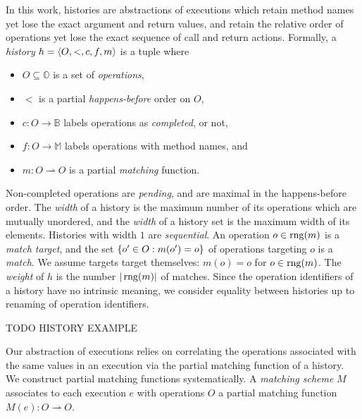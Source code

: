 In this work, histories are abstractions of executions which retain method
names yet lose the exact argument and return values, and retain the relative
order of operations yet lose the exact sequence of call and return actions.
Formally, a \emph{history} $h = {\left\langle{O,<,c,f,m}\right\rangle}$ is a tuple where
\begin{itemize}

  \item $O \subseteq \mathbb{O}$ is a set of \emph{operations},

  \item $<$ is a partial \emph{happens-before} order on $O$,

  \item $c: O \to \mathbb{B}$ labels operations as \emph{completed}, or not,

  \item $f: O \to \mathbb{M}$ labels operations with method names, and

  \item $m: O \rightharpoonup O$ is a partial \emph{matching} function.

\end{itemize}
Non-completed operations are \emph{pending}, and are maximal in the
happens-before order. The \emph{width} of a history is the maximum number of
its operations which are mutually unordered, and the \emph{width} of a history
set is the maximum width of its elements. Histories with width $1$ are
\emph{sequential}. An operation $o \in \operatorname{rng}(m)$ is a \emph{match target}, and
the set ${\{{ o' \in O : m(o') = o}\}}$ of operations targeting $o$ is a
\emph{match}. We assume targets target themselves: $m(o) = o$ for $o \in
\operatorname{rng}(m)$. The \emph{weight} of $h$ is the number $|\operatorname{rng}(m)|$ of matches.
Since the operation identifiers of a history have no intrinsic meaning, we
consider equality between histories up to renaming of operation identifiers.

\begin{example}

  TODO HISTORY EXAMPLE

\end{example}

Our abstraction of executions relies on correlating the operations associated
with the same values in an execution via the partial matching function of a
history. We construct partial matching functions systematically. A
\emph{matching scheme} $M$ associates to each execution $e$ with operations $O$
a partial matching function $M(e): O \rightharpoonup O$.

